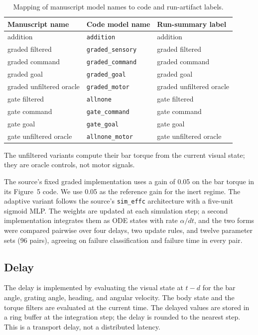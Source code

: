 \documentclass[pdflatex,sn-nature]{sn-jnl}
\begin{document}
\begin{table}[h]
\caption{Mapping of manuscript model names to code and run-artifact labels.}\label{tab:names}%
\small
\begin{tabular}{lll}
\toprule
Manuscript name & Code model name & Run-summary label \\
\midrule
addition & \texttt{addition} & addition \\
graded filtered & \texttt{graded\_sensory} & graded filtered \\
graded command & \texttt{graded\_command} & graded command \\
graded goal & \texttt{graded\_goal} & graded goal \\
graded unfiltered oracle & \texttt{graded\_motor} & graded unfiltered oracle \\
gate filtered & \texttt{allnone} & gate filtered \\
gate command & \texttt{gate\_command} & gate command \\
gate goal & \texttt{gate\_goal} & gate goal \\
gate unfiltered oracle & \texttt{allnone\_motor} & gate unfiltered oracle \\
\bottomrule
\end{tabular}
\end{table}

The unfiltered variants compute their bar torque from the current visual state; they are oracle controls, not motor signals.

The source's fixed graded implementation uses a gain of 0.05 on the bar torque in its Figure~5 code. We use 0.05 as the reference gain for the inert regime. The adaptive variant follows the source's \texttt{sim\_effc} architecture with a five-unit sigmoid MLP. The weights are updated at each simulation step; a second implementation integrates them as ODE states with rate $\alpha/dt$, and the two forms were compared pairwise over four delays, two update rules, and twelve parameter sets (96 pairs), agreeing on failure classification and failure time in every pair.

\subsection{Delay}

The delay is implemented by evaluating the visual state at $t-d$ for the bar angle, grating angle, heading, and angular velocity. The body state and the torque filters are evaluated at the current time. The delayed values are stored in a ring buffer at the integration step; the delay is rounded to the nearest step. This is a transport delay, not a distributed latency.
\end{document}
